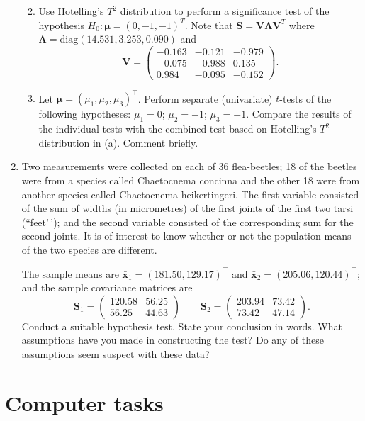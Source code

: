 \documentclass[
]{book}
\providecommand{\tightlist}{%
  \setlength{\itemsep}{0pt}\setlength{\parskip}{0pt}}
\theoremstyle{definition}
\theoremstyle{definition}
\theoremstyle{definition}
\theoremstyle{definition}
\theoremstyle{remark}
\begin{document}
\begin{enumerate}
  \begin{enumerate}
  \def\labelenumii{\roman{enumii}.}
  \tightlist
  \item
    Use Hotelling's \(T^2\) distribution to perform a significance test of the hypothesis \(H_0: {\boldsymbol{\mu}}= (0,-1,-1)^T\). Note that \(\mathbf S= \mathbf V\boldsymbol \Lambda\mathbf V^T\) where \(\boldsymbol \Lambda= \text{diag}(14.531, 3.253,0.090)\) and
    \[\mathbf V= \begin{pmatrix} -0.163 & -0.121 & -0.979 \\ -0.075 & -0.988 & 0.135 \\ 0.984 & -0.095 & -0.152 \end{pmatrix}.\]
  \item
    Let \({\boldsymbol{\mu}}= (\mu_1,\mu_2,\mu_3)^\top\). Perform separate (univariate) \(t\)-tests of the following hypotheses: \(\mu_1 = 0\); \(\mu_2 = -1\); \(\mu_3 = -1\). Compare the results of the individual tests with the combined test based on Hotelling's \(T^2\) distribution in (a). Comment briefly.
  \end{enumerate}
\item
  Two measurements were collected on each of 36 flea-beetles; 18 of the beetles were from a species called Chaetocnema concinna and the other 18 were from another species called Chaetocnema heikertingeri. The first variable consisted of the sum of widths (in micrometres) of the first joints of the first two tarsi (``feet'\,'); and the second variable consisted of the corresponding sum for the second joints. It is of interest to know
  whether or not the population means of the two species are different.

  The sample means are \(\bar{\mathbf x}_1 = (181.50,129.17)^\top\) and \(\bar{\mathbf x}_2 = (205.06,120.44)^\top\); and the sample covariance matrices are
  \[\mathbf S_1 = \begin{pmatrix} 120.58 & 56.25 \\ 56.25 & 44.63 \end{pmatrix} \qquad
  \mathbf S_2 = \begin{pmatrix} 203.94 & 73.42 \\ 73.42 & 47.14 \end{pmatrix}.\]
  Conduct a suitable hypothesis test. State your conclusion in words. What assumptions have you made in constructing the test? Do any of these assumptions seem suspect with these data?
\end{enumerate}

\section{Computer tasks}\label{computer-tasks-3}
\end{document}
